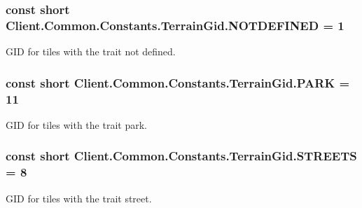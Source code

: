 \subsubsection[{N\+O\+T\+D\+E\+F\+I\+N\+E\+D}]{\setlength{\rightskip}{0pt plus 5cm}const short Client.\+Common.\+Constants.\+Terrain\+Gid.\+N\+O\+T\+D\+E\+F\+I\+N\+E\+D = 1}\label{classClient_1_1Common_1_1Constants_1_1TerrainGid_a1d9023504f29529f409846eb4a8a58f6}


G\+I\+D for tiles with the trait not defined. 

\hypertarget{classClient_1_1Common_1_1Constants_1_1TerrainGid_a2565637fcd2b7744a10ae773d22b39a0}{}
\subsubsection[{P\+A\+R\+K}]{\setlength{\rightskip}{0pt plus 5cm}const short Client.\+Common.\+Constants.\+Terrain\+Gid.\+P\+A\+R\+K = 11}\label{classClient_1_1Common_1_1Constants_1_1TerrainGid_a2565637fcd2b7744a10ae773d22b39a0}


G\+I\+D for tiles with the trait park. 

\hypertarget{classClient_1_1Common_1_1Constants_1_1TerrainGid_a2f9d7a90ad19d1eded7bff4c418adae0}{}
\subsubsection[{S\+T\+R\+E\+E\+T\+S}]{\setlength{\rightskip}{0pt plus 5cm}const short Client.\+Common.\+Constants.\+Terrain\+Gid.\+S\+T\+R\+E\+E\+T\+S = 8}\label{classClient_1_1Common_1_1Constants_1_1TerrainGid_a2f9d7a90ad19d1eded7bff4c418adae0}


G\+I\+D for tiles with the trait street. 

\hypertarget{classClient_1_1Common_1_1Constants_1_1TerrainGid_a580b92e0569e5db71aa6782f545cf99b}{}
